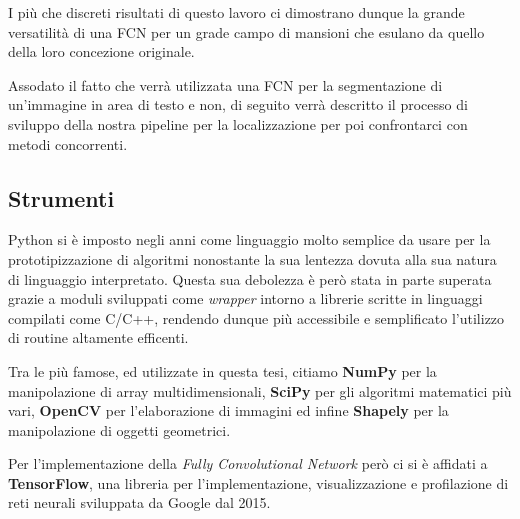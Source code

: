 I più che discreti risultati di questo lavoro ci dimostrano dunque la grande versatilità di una FCN per un grade campo di mansioni che esulano da quello della loro concezione originale.

Assodato il fatto che verrà utilizzata una FCN per la segmentazione di un'immagine in area di testo e non, di seguito verrà descritto il processo di sviluppo della nostra pipeline per la localizzazione per poi confrontarci con metodi concorrenti.


\subsection{Strumenti}
Python\cite{python} si è imposto negli anni come linguaggio molto semplice da usare per la prototipizzazione di algoritmi nonostante la sua lentezza dovuta alla sua natura di linguaggio interpretato. Questa sua debolezza è però stata in parte superata grazie a moduli sviluppati come \textit{wrapper} intorno a librerie scritte in linguaggi compilati come C/C++, rendendo dunque più accessibile e semplificato l'utilizzo di routine altamente efficenti.\par
Tra le più famose, ed utilizzate in questa tesi, citiamo \textbf{NumPy}\cite{numpy} per la manipolazione di array multidimensionali, \textbf{SciPy}\cite{scipy} per gli algoritmi matematici più vari, \textbf{OpenCV}\cite{opencv} per l'elaborazione di immagini ed infine \textbf{Shapely}\cite{shapely} per la manipolazione di oggetti geometrici.\par
Per l'implementazione della \textit{Fully Convolutional Network} però ci si è affidati a \textbf{TensorFlow}\cite{tensorflow}, una libreria per l'implementazione, visualizzazione e profilazione di reti neurali sviluppata da Google dal 2015.


